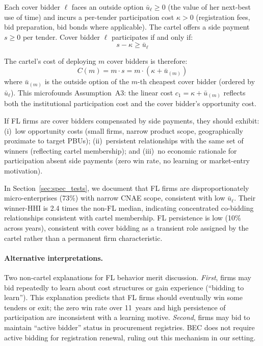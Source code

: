 Each cover bidder $\ell$ faces an outside option $\bar{u}_\ell \geq 0$
(the value of her next-best use of time) and incurs a per-tender
participation cost $\kappa > 0$ (registration fees, bid preparation,
bid bonds where applicable). The cartel offers a side payment
$s \geq 0$ per tender. Cover bidder $\ell$ participates if and only
if:
\begin{equation}
  s - \kappa \geq \bar{u}_\ell
  \label{eq:participation_constraint}
\end{equation}

The cartel's cost of deploying $m$ cover bidders is therefore:
\begin{equation}
  C(m) = m \cdot s = m \cdot (\kappa + \bar{u}_{(m)})
  \label{eq:cover_cost_micro}
\end{equation}
where $\bar{u}_{(m)}$ is the outside option of the $m$-th cheapest
cover bidder (ordered by $\bar{u}_\ell$). This microfounds
Assumption~A3: the linear cost $c_1 = \kappa + \bar{u}_{(m)}$
reflects both the institutional participation cost and the cover
bidder's opportunity cost.

\begin{prediction}
\label{pred:rationality}
If FL firms are cover bidders compensated by side payments, they
should exhibit: (i)~low opportunity costs (small firms, narrow
product scope, geographically proximate to target PBUs);
(ii)~persistent relationships with the same set of winners
(reflecting cartel membership); and (iii)~no economic rationale
for participation absent side payments (zero win rate, no learning
or market-entry motivation).
\end{prediction}

\noindent In Section~\ref{sec:spec_tests}, we document that FL firms
are disproportionately micro-enterprises (73\%) with narrow CNAE
scope, consistent with low $\bar{u}_\ell$. Their winner-HHI is 2.4
times the non-FL median, indicating concentrated co-bidding
relationships consistent with cartel membership. FL persistence is
low (10\% across years), consistent with cover bidding as a
transient role assigned by the cartel rather than a permanent firm
characteristic.

\paragraph{Alternative interpretations.}
Two non-cartel explanations for FL behavior merit discussion.
\emph{First}, firms may bid repeatedly to learn about cost
structures or gain experience (``bidding to learn''). This
explanation predicts that FL firms should eventually win some
tenders or exit; the zero win rate over 11~years and high
persistence of participation are inconsistent with a learning
motive. \emph{Second}, firms may bid to maintain ``active bidder''
status in procurement registries. BEC does not require active
bidding for registration renewal, ruling out this mechanism in
our setting.

